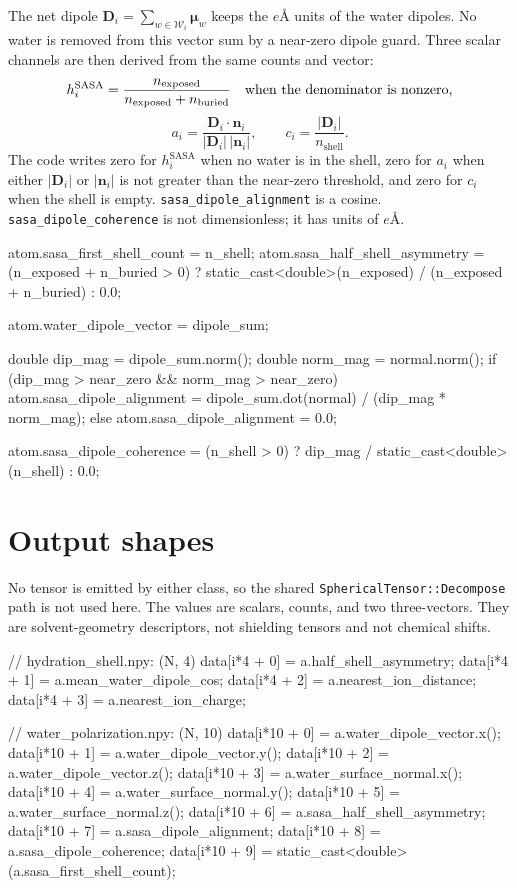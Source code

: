 \documentclass[11pt]{article}
\newcommand{\code}[1]{\texttt{#1}}
\begin{document}
The net dipole \(\bm D_i=\sum_{w\in\mathcal W_i}\bm\mu_w\) keeps the
\(\si{\elementarycharge\angstrom}\) units of the water dipoles. No water is
removed from this vector sum by a near-zero dipole guard. Three scalar channels
are then derived from the same counts and vector:
\[
  h_i^{\mathrm{SASA}} =
  \frac{n_{\mathrm{exposed}}}
       {n_{\mathrm{exposed}}+n_{\mathrm{buried}}}
  \quad\hbox{when the denominator is nonzero,}
\]
\[
  a_i =
  \frac{\bm D_i\cdot\bm n_i}{|\bm D_i|\,|\bm n_i|},
  \qquad
  c_i = \frac{|\bm D_i|}{n_{\mathrm{shell}}}.
\]
The code writes zero for \(h_i^{\mathrm{SASA}}\) when no water is in the shell,
zero for \(a_i\) when either \(|\bm D_i|\) or \(|\bm n_i|\) is not greater than
the near-zero threshold, and zero for \(c_i\) when the shell is empty.
\code{sasa\_dipole\_alignment} is a cosine. \code{sasa\_dipole\_coherence} is
not dimensionless; it has units of \(\si{\elementarycharge\angstrom}\).

\begin{codebox}
atom.sasa_first_shell_count = n_shell;
atom.sasa_half_shell_asymmetry =
    (n_exposed + n_buried > 0)
    ? static_cast<double>(n_exposed) / (n_exposed + n_buried)
    : 0.0;

atom.water_dipole_vector = dipole_sum;

double dip_mag = dipole_sum.norm();
double norm_mag = normal.norm();
if (dip_mag > near_zero && norm_mag > near_zero)
    atom.sasa_dipole_alignment =
        dipole_sum.dot(normal) / (dip_mag * norm_mag);
else
    atom.sasa_dipole_alignment = 0.0;

atom.sasa_dipole_coherence =
    (n_shell > 0) ? dip_mag / static_cast<double>(n_shell) : 0.0;
\end{codebox}

\section{Output shapes}

No tensor is emitted by either class, so the shared
\code{SphericalTensor::Decompose} path is not used here. The values are scalars,
counts, and two three-vectors. They are solvent-geometry descriptors, not
shielding tensors and not chemical shifts.

\begin{codebox}
// hydration_shell.npy: (N, 4)
data[i*4 + 0] = a.half_shell_asymmetry;
data[i*4 + 1] = a.mean_water_dipole_cos;
data[i*4 + 2] = a.nearest_ion_distance;
data[i*4 + 3] = a.nearest_ion_charge;

// water_polarization.npy: (N, 10)
data[i*10 + 0] = a.water_dipole_vector.x();
data[i*10 + 1] = a.water_dipole_vector.y();
data[i*10 + 2] = a.water_dipole_vector.z();
data[i*10 + 3] = a.water_surface_normal.x();
data[i*10 + 4] = a.water_surface_normal.y();
data[i*10 + 5] = a.water_surface_normal.z();
data[i*10 + 6] = a.sasa_half_shell_asymmetry;
data[i*10 + 7] = a.sasa_dipole_alignment;
data[i*10 + 8] = a.sasa_dipole_coherence;
data[i*10 + 9] = static_cast<double>(a.sasa_first_shell_count);
\end{codebox}
\end{document}
